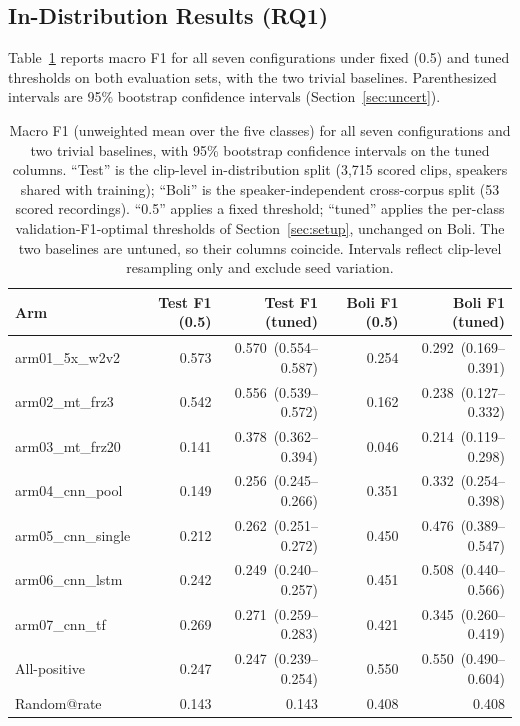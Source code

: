 \documentclass[a4paper,orivec]{llncs}
\newcommand{\ci}[1]{{\scriptsize\,(#1)}}
\begin{document}
\subsection{In-Distribution Results (RQ1)}
\label{sec:res-indist}
Table~\ref{tab:macro} reports macro F1 for all seven configurations under fixed
(0.5) and tuned thresholds on both evaluation sets, with the two trivial
baselines. Parenthesized intervals are 95\% bootstrap confidence intervals
(Section~\ref{sec:uncert}).
\begin{table}[!htbp]
\caption{Macro F1 (unweighted mean over the five classes) for all seven
configurations and two trivial baselines, with 95\% bootstrap confidence intervals
on the tuned columns. ``Test'' is the clip-level in-distribution split (3{,}715
scored clips, speakers shared with training); ``Boli'' is the speaker-independent
cross-corpus split (53 scored recordings). ``0.5'' applies a fixed threshold;
``tuned'' applies the per-class validation-F1-optimal thresholds of
Section~\ref{sec:setup}, unchanged on Boli. The two baselines are untuned, so
their columns coincide. Intervals reflect clip-level resampling only and exclude
seed variation.}
\label{tab:macro}
\centering
\footnotesize
\setlength{\tabcolsep}{2.5pt}
\renewcommand{\arraystretch}{0.9}
\begin{tabular}{lrrrr}
\hline
Arm & Test F1 (0.5) & Test F1 (tuned) & Boli F1 (0.5) & Boli F1 (tuned)\\
\hline
arm01\_5x\_w2v2 & 0.573 & 0.570 \ci{0.554--0.587} & 0.254 & 0.292 \ci{0.169--0.391}\\
arm02\_mt\_frz3 & 0.542 & 0.556 \ci{0.539--0.572} & 0.162 & 0.238 \ci{0.127--0.332}\\
arm03\_mt\_frz20 & 0.141 & 0.378 \ci{0.362--0.394} & 0.046 & 0.214 \ci{0.119--0.298}\\
arm04\_cnn\_pool & 0.149 & 0.256 \ci{0.245--0.266} & 0.351 & 0.332 \ci{0.254--0.398}\\
arm05\_cnn\_single & 0.212 & 0.262 \ci{0.251--0.272} & 0.450 & 0.476 \ci{0.389--0.547}\\
arm06\_cnn\_lstm & 0.242 & 0.249 \ci{0.240--0.257} & 0.451 & 0.508 \ci{0.440--0.566}\\
arm07\_cnn\_tf & 0.269 & 0.271 \ci{0.259--0.283} & 0.421 & 0.345 \ci{0.260--0.419}\\
\hline
All-positive & 0.247 & 0.247 \ci{0.239--0.254} & 0.550 & 0.550 \ci{0.490--0.604}\\
Random@rate & 0.143 & 0.143 & 0.408 & 0.408\\
\hline
\end{tabular}
\end{table}
\end{document}
